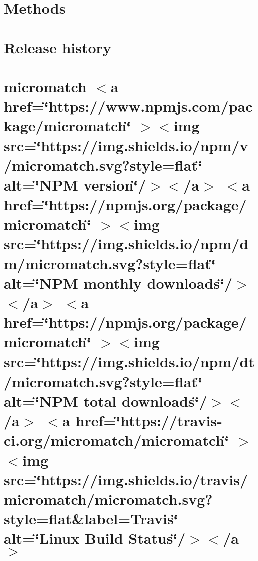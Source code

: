 \documentclass[twoside]{book}
\newcommand{\+}{\discretionary{\mbox{\scriptsize$\hookleftarrow$}}{}{}}
\begin{document}
\chapter{Methods}
\label{md__c___users_vaishnavi_jadhav__desktop__developer_code_mean_stack_example_client_node_modules_methods__r_e_a_d_m_e}

\chapter{Release history}
\label{md__c___users_vaishnavi_jadhav__desktop__developer_code_mean_stack_example_client_node_modules_micromatch__c_h_a_n_g_e_l_o_g}

\chapter{micromatch \texorpdfstring{$<$}{<}a href=\char`\"{}https\+://www.\+npmjs.\+com/package/micromatch\char`\"{} \texorpdfstring{$>$}{>}\texorpdfstring{$<$}{<}img src=\char`\"{}https\+://img.\+shields.\+io/npm/v/micromatch.\+svg?style=flat\char`\"{} alt=\char`\"{}\+NPM version\char`\"{}/\texorpdfstring{$>$}{>}\texorpdfstring{$<$}{<}/a\texorpdfstring{$>$}{>} \texorpdfstring{$<$}{<}a href=\char`\"{}https\+://npmjs.\+org/package/micromatch\char`\"{} \texorpdfstring{$>$}{>}\texorpdfstring{$<$}{<}img src=\char`\"{}https\+://img.\+shields.\+io/npm/dm/micromatch.\+svg?style=flat\char`\"{} alt=\char`\"{}\+NPM monthly downloads\char`\"{}/\texorpdfstring{$>$}{>}\texorpdfstring{$<$}{<}/a\texorpdfstring{$>$}{>} \texorpdfstring{$<$}{<}a href=\char`\"{}https\+://npmjs.\+org/package/micromatch\char`\"{} \texorpdfstring{$>$}{>}\texorpdfstring{$<$}{<}img src=\char`\"{}https\+://img.\+shields.\+io/npm/dt/micromatch.\+svg?style=flat\char`\"{} alt=\char`\"{}\+NPM total downloads\char`\"{}/\texorpdfstring{$>$}{>}\texorpdfstring{$<$}{<}/a\texorpdfstring{$>$}{>} \texorpdfstring{$<$}{<}a href=\char`\"{}https\+://travis-\/ci.\+org/micromatch/micromatch\char`\"{} \texorpdfstring{$>$}{>}\texorpdfstring{$<$}{<}img src=\char`\"{}https\+://img.\+shields.\+io/travis/micromatch/micromatch.\+svg?style=flat\&label=\+Travis\char`\"{} alt=\char`\"{}\+Linux Build Status\char`\"{}/\texorpdfstring{$>$}{>}\texorpdfstring{$<$}{<}/a\texorpdfstring{$>$}{>}}
\label{md__c___users_vaishnavi_jadhav__desktop__developer_code_mean_stack_example_client_node_modules_micromatch__r_e_a_d_m_e}

\end{document}
